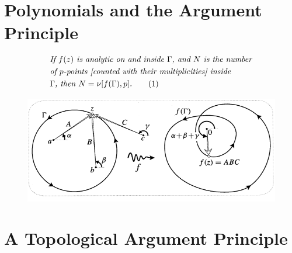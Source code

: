 \documentclass[12pt]{article}
\newcommand\numberthis{\addtocounter{equation}{1}\tag{\theequation}}
\def\tt{\textit}
\begin{document}
\section{Polynomials and the Argument Principle}
\begin{align*}
    &\tt{If $f(z)$ is analytic on and inside $\Gamma$, and $N$ is the number}\\
    &\tt{of $p$-points [counted with their multiplicities] inside}\\
    &\tt{$\Gamma$, then $N=\nu[f(\Gamma),p]$.} \numberthis \label{e4}
\end{align*}
\begin{figure}[h!]
    \centering
    \includegraphics[scale=0.7]{fig_5}
    \label{f5}
\end{figure}
\section{A Topological Argument Principle}
\end{document}
